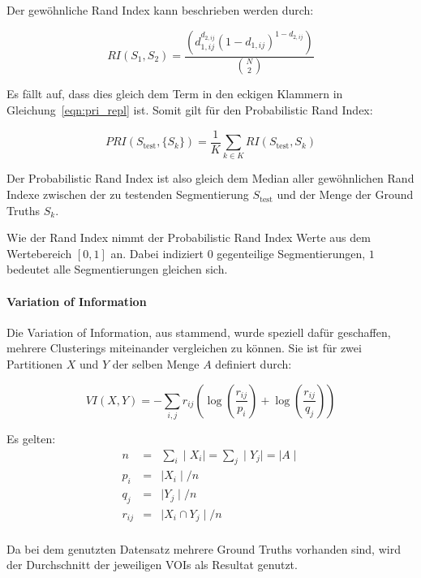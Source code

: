 Der gewöhnliche Rand Index kann beschrieben werden durch:

\begin{equation}
RI(S_1, S_2) = \frac{\left(d_{1,ij}^{d_{2,ij}}\left(1-d_{1,ij}\right)^{1-d_{2,ij}}\right)}{\binom{N}{2}}
\end{equation}

Es fällt auf, dass dies gleich dem Term in den eckigen Klammern in Gleichung~\ref{eqn:pri_repl} ist. Somit gilt für den Probabilistic Rand Index:

\begin{equation}
PRI(S_\text{test}, \{S_k\}) = \frac{1}{K}\sum_{k\in K}RI(S_\text{test}, S_k)
\end{equation}

Der Probabilistic Rand Index ist also gleich dem Median aller gewöhnlichen Rand Indexe zwischen der zu testenden Segmentierung $S_\text{test}$ und der Menge der Ground Truths ${S_k}$.

Wie der Rand Index nimmt der Probabilistic Rand Index Werte aus dem Wertebereich $\left[0, 1\right]$ an. Dabei indiziert $0$ gegenteilige Segmentierungen, $1$ bedeutet alle Segmentierungen gleichen sich. \cite{pantofaru_07}

\paragraph{Variation of Information}

Die Variation of Information, aus \cite{meil_03} stammend, wurde speziell dafür geschaffen, mehrere Clusterings miteinander vergleichen zu können. Sie ist für zwei Partitionen $X$ und $Y$ der selben Menge $A$ definiert durch:

\begin{equation}
VI(X, Y) = -\sum_{i, j} r_{ij}\left(\log\left(\frac{r_{ij}}{p_i}\right)+\log\left(\frac{r_{ij}}{q_j}\right)\right)
\end{equation}

Es gelten:
\begin{eqnarray}
n&=&\sum_i\mid X_i\mid=\sum_j \mid Y_j\mid=\mid A\mid\\
p_i&=&\mid X_i\mid/n\\
q_j&=&\mid Y_j\mid/n\\
r_{ij}&=&\mid X_i\cap Y_j\mid/n\\
\end{eqnarray}

Da bei dem genutzten Datensatz mehrere Ground Truths vorhanden sind, wird der Durchschnitt der jeweiligen VOIs als Resultat genutzt.


